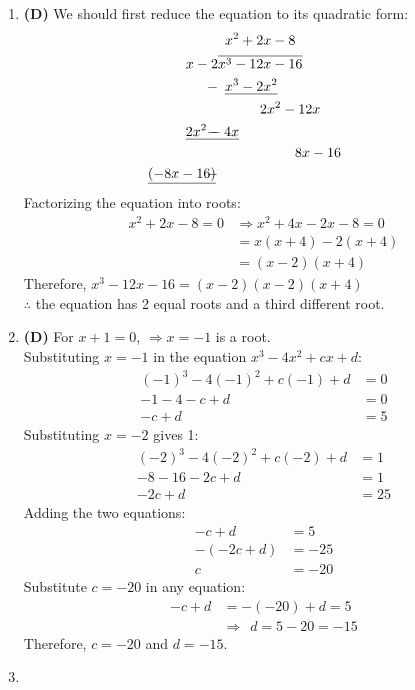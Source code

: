 \begin{multicols}{2}
\begin{enumerate}[label={\textbf{\arabic*.}}]
\item \textbf{(D)} We should first reduce the equation to its quadratic form:
        \begin{align*}
            & \hspace{5pt} x^2 + 2x - 8 \\
            x - 2 & \overline{x^3 - 12x - 16} \\ 
            - & \hspace{5pt} \underline{x^3 - 2x^2} \\
            & \hspace{30pt} 2x^2 - 12x \\
            - & \hspace{-23pt} \underline{2x^2 - 4x} \\
            & \hspace{55pt} 8x - 16 \\
            - & \hspace{-50pt} \underline{(-8x - 16)}
        \end{align*}
        Factorizing the equation into roots:
        \begin{align*} 
            x^2 + 2x - 8 = 0 &\Rightarrow x^2 + 4x - 2x - 8 = 0 \\
            &= x(x + 4) - 2(x + 4) \\
            &= (x - 2)(x + 4)
        \end{align*}
        Therefore, \( x^3 - 12x - 16 = (x - 2)(x - 2)(x + 4) \) \\
        \(\therefore\) the equation has 2 equal roots and a third different root.     
\item \textbf{(D)} For \( x + 1 = 0 \), \(\Rightarrow x = -1\) is a root. \\
    Substituting \( x = -1 \) in the equation \( x^3 - 4x^2 + cx + d \):
    \begin{align*}
        (-1)^3 - 4(-1)^2 + c(-1) + d &= 0 \\
        -1 - 4 - c + d &= 0 \\
        -c + d &= 5
    \end{align*}
    Substituting \( x = -2 \) gives 1:
    \begin{align*}
        (-2)^3 - 4(-2)^2 + c(-2) + d &= 1 \\
        -8 - 16 - 2c + d &= 1 \\
        -2c + d &= 25
    \end{align*}
    Adding the two equations:
    \begin{align*}
         -c + d &= 5 \\
        -(-2c + d) &= -25 \\
        c &= -20
    \end{align*} 
    Substitute \( c = -20 \) in any equation:
    \begin{align*}
        -c + d &= -(-20) + d = 5 \\
        & \Rightarrow \hspace{5pt} d = 5 - 20 = -15
    \end{align*}
    Therefore, \( c = -20 \) and \( d = -15 \). 
    \item 


\end{enumerate}
\end{multicols}
